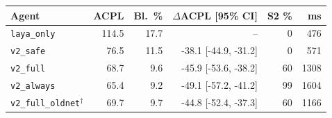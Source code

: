 \scriptsize\setlength{\tabcolsep}{2.2pt}\begin{tabular}{lrrrrr}\toprule
Agent & ACPL & Bl.\ \% & $\Delta$ACPL [95\% CI] & S2 \% & ms \\
\midrule
\texttt{laya\_only} & 114.5 & 17.7 & -- & 0 & 476 \\
\texttt{v2\_safe} & 76.5 & 11.5 & -38.1 [-44.9, -31.2] & 0 & 571 \\
\texttt{v2\_full} & 68.7 & 9.6 & -45.9 [-53.6, -38.2] & 60 & 1308 \\
\texttt{v2\_always} & 65.4 & 9.2 & -49.1 [-57.2, -41.2] & 99 & 1604 \\
\texttt{v2\_full\_oldnet}$^{\dagger}$ & 69.7 & 9.7 & -44.8 [-52.4, -37.3] & 60 & 1166 \\
\bottomrule\end{tabular}
